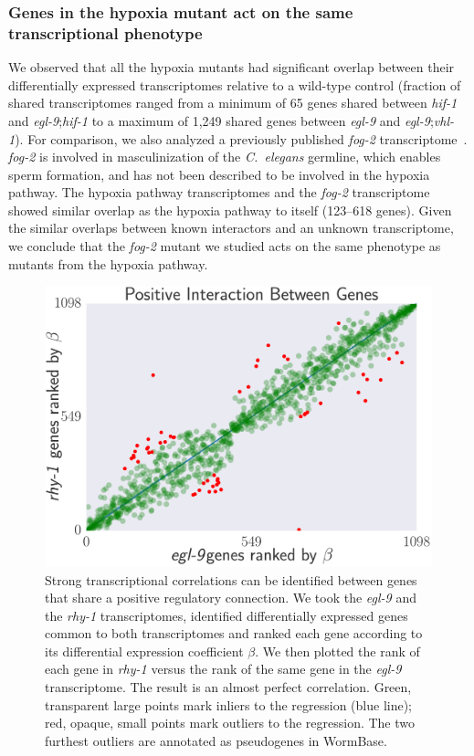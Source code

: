 \documentclass[9pt,twocolumn,twoside]{pnas-new}
\newcommand{\cel}{\emph{C.~elegans}}
\newcommand{\egl}{\emph{egl-9}}
\newcommand{\rhy}{\emph{rhy-1}}
\newcommand{\vhl}{\emph{vhl-1}}
\newcommand{\hif}{\emph{hif-1}}
\newcommand{\fog}{\emph{fog-2}}
\begin{document}
\subsubsection{Genes in the hypoxia mutant act on the same transcriptional phenotype}
\label{sec:phenotypes}
We observed that all the hypoxia mutants had significant overlap between their
differentially expressed transcriptomes relative to a wild-type control
(fraction of shared transcriptomes ranged from a minimum of 65 genes
shared between \hif{} and \egl{};\hif{} to a maximum of 1,249 shared genes between
\egl{} and \egl{};\vhl{}). For comparison, we also analyzed a previously published
\fog{} transcriptome~\cite{Angeles-Albores2016a}. \fog{} is involved in masculinization
of the \cel{} germline, which enables sperm formation, and has not been described
to be involved in the hypoxia pathway. The hypoxia pathway transcriptomes
and the \fog{} transcriptome showed similar overlap as the hypoxia pathway to itself
(123--618 genes). Given the similar overlaps between known interactors and an unknown
transcriptome, we conclude that the \fog{} mutant we studied acts on the same
phenotype as mutants from the hypoxia pathway.

\begin{figure}%
\centering
\includegraphics[width=\linewidth]{figs/correlative_genetics.pdf}
\caption{
Strong transcriptional correlations can be identified between genes
that share a positive regulatory connection. We took the \egl{} and the \rhy{}
transcriptomes, identified differentially expressed genes common to both
transcriptomes and ranked each gene according to its differential expression
coefficient $\beta$. We then plotted the rank of each gene in \rhy{} versus the
rank of the same gene in the \egl{} transcriptome. The result is an almost
perfect correlation. Green, transparent large points mark inliers to the
regression (blue line); red, opaque, small points mark outliers to the
regression. The two furthest outliers are annotated as pseudogenes in WormBase.
}
\label{fig:genetic_interactions}
\end{figure}
\end{document}

